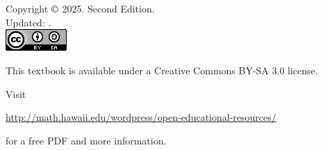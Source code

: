 \chapter*{}
\vfill

\noindent Copyright $\copyright$ 2025. Second Edition. \\
Updated: \versiondate. \\

\noindent\includegraphics[width=.7in]{extraTex/preamble/88x31.png}

\noindent This textbook is available under a Creative Commons BY-SA 3.0 license.

\noindent Visit 

\noindent\url{http://math.hawaii.edu/wordpress/open-educational-resources/}

\noindent for a free PDF and more information.\\ %
\printlocation


